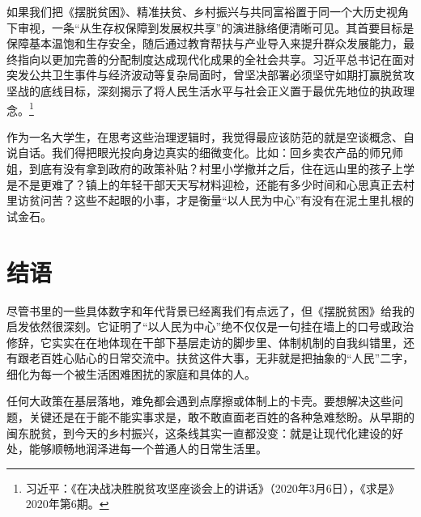 \documentclass[12pt,a4paper]{ctexart}
\begin{document}
如果我们把《摆脱贫困》、精准扶贫、乡村振兴与共同富裕置于同一个大历史视角下审视，一条“从生存权保障到发展权共享”的演进脉络便清晰可见。其首要目标是保障基本温饱和生存安全，随后通过教育帮扶与产业导入来提升群众发展能力，最终指向以更加完善的分配制度达成现代化成果的全社会共享。习近平总书记在面对突发公共卫生事件与经济波动等复杂局面时，曾坚决部署必须坚守如期打赢脱贫攻坚战的底线目标，深刻揭示了将人民生活水平与社会正义置于最优先地位的执政理念。\footnote{习近平：《在决战决胜脱贫攻坚座谈会上的讲话》（2020年3月6日），《求是》2020年第6期。}

作为一名大学生，在思考这些治理逻辑时，我觉得最应该防范的就是空谈概念、自说自话。我们得把眼光投向身边真实的细微变化。比如：回乡卖农产品的师兄师姐，到底有没有拿到政府的政策补贴？村里小学撤并之后，住在远山里的孩子上学是不是更难了？镇上的年轻干部天天写材料迎检，还能有多少时间和心思真正去村里访贫问苦？这些不起眼的小事，才是衡量“以人民为中心”有没有在泥土里扎根的试金石。

\section*{结语}

尽管书里的一些具体数字和年代背景已经离我们有点远了，但《摆脱贫困》给我的启发依然很深刻。它证明了“以人民为中心”绝不仅仅是一句挂在墙上的口号或政治修辞，它实实在在地体现在干部下基层走访的脚步里、体制机制的自我纠错里，还有跟老百姓心贴心的日常交流中。扶贫这件大事，无非就是把抽象的“人民”二字，细化为每一个被生活困难困扰的家庭和具体的人。

任何大政策在基层落地，难免都会遇到点摩擦或体制上的卡壳。要想解决这些问题，关键还是在于能不能实事求是，敢不敢直面老百姓的各种急难愁盼。从早期的闽东脱贫，到今天的乡村振兴，这条线其实一直都没变：就是让现代化建设的好处，能够顺畅地润泽进每一个普通人的日常生活里。
\end{document}
